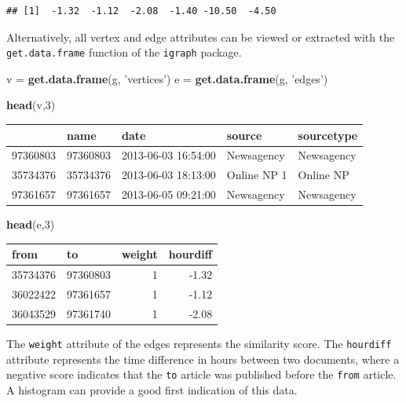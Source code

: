 \documentclass[]{article}
\newenvironment{Shaded}{\begin{snugshade}}{\end{snugshade}}
\newcommand{\KeywordTok}[1]{\textcolor[rgb]{0.13,0.29,0.53}{\textbf{{#1}}}}
\newcommand{\DecValTok}[1]{\textcolor[rgb]{0.00,0.00,0.81}{{#1}}}
\newcommand{\StringTok}[1]{\textcolor[rgb]{0.31,0.60,0.02}{{#1}}}
\newcommand{\NormalTok}[1]{{#1}}
\begin{document}
\begin{verbatim}
## [1]  -1.32  -1.12  -2.08  -1.40 -10.50  -4.50
\end{verbatim}

Alternatively, all vertex and edge attributes can be viewed or extracted
with the \texttt{get.data.frame} function of the \texttt{igraph}
package.

\begin{Shaded}
\begin{Highlighting}[]
\NormalTok{v =}\StringTok{ }\KeywordTok{get.data.frame}\NormalTok{(g, }\StringTok{'vertices'}\NormalTok{)}
\NormalTok{e =}\StringTok{ }\KeywordTok{get.data.frame}\NormalTok{(g, }\StringTok{'edges'}\NormalTok{)}

\KeywordTok{head}\NormalTok{(v,}\DecValTok{3}\NormalTok{)}
\end{Highlighting}
\end{Shaded}

\begin{longtable}[c]{@{}lllll@{}}
\toprule
& name & date & source & sourcetype\tabularnewline
\midrule
\endhead
97360803 & 97360803 & 2013-06-03 16:54:00 & Newsagency &
Newsagency\tabularnewline
35734376 & 35734376 & 2013-06-03 18:13:00 & Online NP 1 & Online
NP\tabularnewline
97361657 & 97361657 & 2013-06-05 09:21:00 & Newsagency &
Newsagency\tabularnewline
\bottomrule
\end{longtable}

\begin{Shaded}
\begin{Highlighting}[]
\KeywordTok{head}\NormalTok{(e,}\DecValTok{3}\NormalTok{)                   }
\end{Highlighting}
\end{Shaded}

\begin{longtable}[c]{@{}llrr@{}}
\toprule
from & to & weight & hourdiff\tabularnewline
\midrule
\endhead
35734376 & 97360803 & 1 & -1.32\tabularnewline
36022422 & 97361657 & 1 & -1.12\tabularnewline
36043529 & 97361740 & 1 & -2.08\tabularnewline
\bottomrule
\end{longtable}

The \texttt{weight} attribute of the edges represents the similarity
score. The \texttt{hourdiff} attribute represents the time difference in
hours between two documents, where a negative score indicates that the
\texttt{to} article was published before the \texttt{from} article. A
histogram can provide a good first indication of this data.
\end{document}

